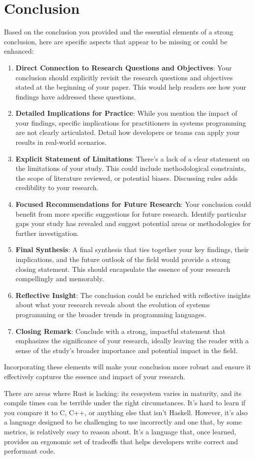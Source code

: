 \documentclass[conference]{IEEEtran}
\begin{document}
\section{Conclusion}
 {\color{red}Based on the conclusion you provided and the essential elements of a strong conclusion, here are specific aspects that appear to be missing or could be enhanced:
  \begin{enumerate}
      \item\textbf{Direct Connection to Research Questions and Objectives}: Your conclusion should explicitly revisit the research questions and objectives stated at the beginning of your paper. This would help readers see how your findings have addressed these questions.
      \item\textbf{Detailed Implications for Practice}: While you mention the impact of your findings, specific implications for practitioners in systems programming are not clearly articulated. Detail how developers or teams can apply your results in real-world scenarios.
      \item\textbf{Explicit Statement of Limitations}: There's a lack of a clear statement on the limitations of your study. This could include methodological constraints, the scope of literature reviewed, or potential biases. Discussing rules adds credibility to your research.
      \item\textbf{Focused Recommendations for Future Research}: Your conclusion could benefit from more specific suggestions for future research. Identify particular gaps your study has revealed and suggest potential areas or methodologies for further investigation.
      \item\textbf{Final Synthesis}: A final synthesis that ties together your key findings, their implications, and the future outlook of the field would provide a strong closing statement. This should encapsulate the essence of your research compellingly and memorably.
      \item\textbf{Reflective Insight}: The conclusion could be enriched with reflective insights about what your research reveals about the evolution of systems programming or the broader trends in programming languages.
      \item\textbf{Closing Remark}: Conclude with a strong, impactful statement that emphasizes the significance of your research, ideally leaving the reader with a sense of the study's broader importance and potential impact in the field.
  \end{enumerate}
  Incorporating these elements will make your conclusion more robust and ensure it effectively captures the essence and impact of your research.}
There are areas where Rust is lacking: its ecosystem varies in maturity, and its compile times can be terrible under the right circumstances. It's hard to learn if you compare it to C, C++, or anything else that isn't Haskell. However, it's also a language designed to be challenging to use incorrectly and one that, by some metrics, is relatively easy to reason about. It's a language that, once learned, provides an ergonomic set of tradeoffs that helps developers write correct and performant code.
\end{document}
